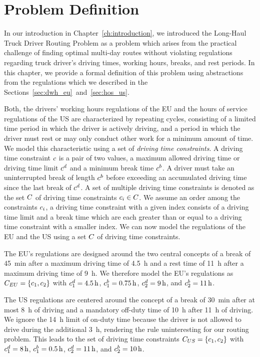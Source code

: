 \chapter{Problem Definition}\label{ch:problem_definitions}
In our introduction in Chapter~\ref{ch:introduction}, we introduced the Long-Haul Truck Driver Routing Problem as a problem which arises from the practical challenge of finding optimal multi-day routes without violating regulations regarding truck driver's driving times, working hours, breaks, and rest periods. In this chapter, we provide a formal definition of this problem using abstractions from the regulations which we described in the Sections~\ref{sec:dwh_eu}~and~\ref{sec:hos_us}.

Both, the drivers' working hours regulations of the EU and the hours of service regulations of the US are characterized by repeating cycles, consisting of a limited time period in which the driver is actively driving, and a period in which the driver must rest or may only conduct other work for a minimum amount of time. We model this characteristic using a set of \emph{driving time constraints}. A driving time constraint $c$ is a pair of two values, a maximum allowed driving time or driving time limit $c^d$ and a minimum break time $c^b$. A driver must take an uninterrupted break of length $c^b$ before exceeding an accumulated driving time since the last break of $c^d$. A set of multiple driving time constraints is denoted as the set $C$ of driving time constraints $c_i \in C$. We assume an order among the constraints $c_i$, a driving time constraint with a given index consists of a driving time limit and a break time which are each greater than or equal to a driving time constraint with a smaller index. We can now model the regulations of the EU and the US using a set $C$ of driving time constraints.

The EU's regulations are designed around the two central concepts of a break of \SI{45}{\minute} after a maximum driving time of \SI{4.5}{\hour} and a rest time of \SI{11}{\hour} after a maximum driving time of \SI{9}{\hour}. We therefore model the EU's regulations as $C_{EU} = \{c_1, c_2\}$ with $c_1^d = \SI{4.5}{\hour}$, $c_1^b = \SI{0.75}{\hour}$, $c_2^d = \SI{9}{\hour}$, and $ c_2^b = \SI{11}{\hour}$.

The US regulations are centered around the concept of a break of \SI{30}{\minute} after at most \SI{8}{\hour} of driving and a mandatory off-duty time of \SI{10}{\hour} after \SI{11}{\hour} of driving. We ignore the \SI{14}{\hour} limit of on-duty time because the driver is not allowed to drive during the additional \SI{3}{\hour}, rendering the rule uninteresting for our routing problem. This leads to the set of driving time constraints $C_{US} = \{c_1, c_2\}$ with $c_1^d = \SI{8}{\hour}$, $c_1^b = \SI{0.5}{\hour}$, $c_2^d = \SI{11}{\hour}$, and $c_2^b = \SI{10}{\hour}$.

